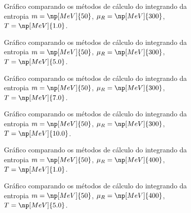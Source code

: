 
\begin{figure}
	
	\caption{Gráfico comparando os métodos de cálculo do integrando da entropia $m = \np[MeV]{50}$, $\mu_R = \np[MeV]{300}$, $T = \np[MeV]{1.0}$. \protect}
	\label{Fig:Test_entropy_integrand_calc_0_3_0}
\end{figure}

\begin{figure}
	
	\caption{Gráfico comparando os métodos de cálculo do integrando da entropia $m = \np[MeV]{50}$, $\mu_R = \np[MeV]{300}$, $T = \np[MeV]{5.0}$. \protect}
	\label{Fig:Test_entropy_integrand_calc_0_3_1}
\end{figure}

\begin{figure}
	
	\caption{Gráfico comparando os métodos de cálculo do integrando da entropia $m = \np[MeV]{50}$, $\mu_R = \np[MeV]{300}$, $T = \np[MeV]{7.0}$. \protect}
	\label{Fig:Test_entropy_integrand_calc_0_3_2}
\end{figure}

\begin{figure}
	
	\caption{Gráfico comparando os métodos de cálculo do integrando da entropia $m = \np[MeV]{50}$, $\mu_R = \np[MeV]{300}$, $T = \np[MeV]{10.0}$. \protect}
	\label{Fig:Test_entropy_integrand_calc_0_3_3}
\end{figure}

\begin{figure}
	
	\caption{Gráfico comparando os métodos de cálculo do integrando da entropia $m = \np[MeV]{50}$, $\mu_R = \np[MeV]{400}$, $T = \np[MeV]{1.0}$. \protect}
	\label{Fig:Test_entropy_integrand_calc_0_4_0}
\end{figure}

\begin{figure}
	
	\caption{Gráfico comparando os métodos de cálculo do integrando da entropia $m = \np[MeV]{50}$, $\mu_R = \np[MeV]{400}$, $T = \np[MeV]{5.0}$. \protect}
	\label{Fig:Test_entropy_integrand_calc_0_4_1}
\end{figure}

